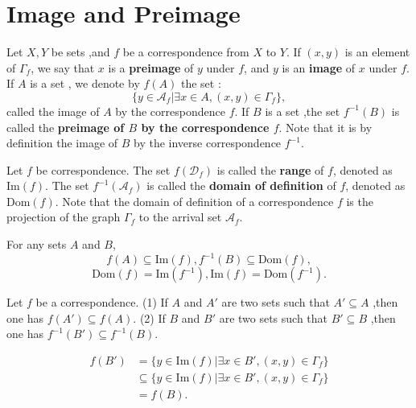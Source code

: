 \documentclass{book}
\numberwithin{equation}{section}
\begin{document}
\section{Image and Preimage}
\begin{definitionenv}
    Let $X,Y$ be sets ,and $f$ be a correspondence from $X$ to $Y$. If $(x,y)$ is an element of $\Gamma_f$, we say that $x$ is a \textbf{preimage } of $y$ under $f$, and $y$ is an \textbf{image} of $x$ under $f$.
    \newline
    If $A$ is a set , we denote by $f(A)$ the set :
    $$\{y\in \mathscr{A}_f|\exists x\in A ,(x,y)\in \Gamma_f\},$$
    called the image of $A$ by the correspondence $f$.
    \newline 
    If $B$ is a set ,the set $f^{-1} (B)$ is called the \textbf{preimage of $B$ by the correspondence $f$}. Note that it is by definition the image of $B$ by the inverse correspondence $f^{-1}$.
\end{definitionenv}
\begin{definitionenv}
    Let $f$ be correspondence. The set $f(\mathscr{D}_f)$ is called the \textbf{range} of $f$, denoted as $\mathrm{Im} (f)$. The set $f^{-1}(\mathscr{A}_f)$ is called the \textbf{domain of definition }of $f$, denoted as $\mathrm{Dom}( f) $.
    Note that the domain of definition of a correspondence $f$ is the projection of the graph $\Gamma_f$ to the arrival set $\mathscr{A}_f$.
\end{definitionenv}
For any sets $ A$ and $B$,
$$f(A)\subseteq \mathrm{Im}(f),f^{-1}(B)\subseteq\mathrm{Dom}(f),$$
$$\mathrm{Dom}(f)=\mathrm{Im}(f^{-1}),\mathrm{Im }(f)=\mathrm{Dom}(f^{-1}).$$
\begin{propositionenv}\label{proposition3.3.1}
    Let $f$ be a correspondence.
    \newline
    (1) If $A$ and $A'$ are two sets such that $A'\subseteq A$ ,then one has $f(A')\subseteq f(A)$.
    \newline
    (2) If $B$ and $B'$ are two sets such that $B'\subseteq B$ ,then one has $f^{-1}(B')\subseteq f^{-1}(B)$.
\end{propositionenv}
\begin{proofenv}
    \begin{align*}
        f(B')&=\{y\in\mathrm{Im}(f)|\exists x\in B',(x,y)\in \Gamma_f\}\\
        &\subseteq\{y\in\mathrm{Im}(f)|\exists x\in B',(x,y)\in \Gamma_f\}\\
        &=f(B).
    \end{align*}
\end{proofenv}    
\end{document}
